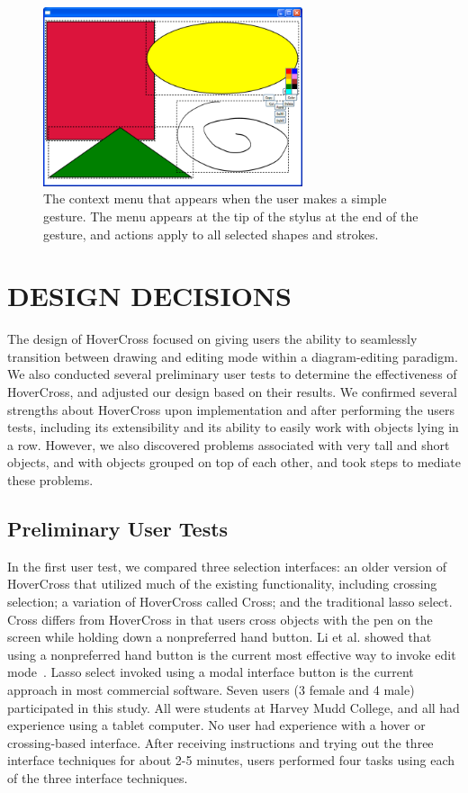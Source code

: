 \documentclass{article}
\begin{document}
\begin{figure}[tb]
\includegraphics[width=3.0in]{ColorMenu}
\caption{The context menu that appears when the user makes a simple
  gesture.  The menu appears at the tip of the stylus at the end of
  the gesture, and actions apply to all selected shapes and strokes.}
\label{fig:contextMenu}
\end{figure}

\section{DESIGN DECISIONS}
The design of HoverCross focused on giving users the ability to seamlessly transition between drawing and editing mode within a diagram-editing paradigm. We also conducted several preliminary user tests to determine the effectiveness of HoverCross, and adjusted our design based on their results.  We confirmed several strengths about HoverCross upon implementation and after performing the users tests, including its extensibility and its ability to easily work with objects lying in a row.  However, we also discovered problems associated with very tall and short objects, and with objects grouped on top of each other, and took steps to mediate these problems.

\subsection{Preliminary User Tests}

In the first user test, we compared three selection interfaces: an older version of HoverCross that utilized much of the existing functionality, including crossing selection; a variation of
HoverCross called Cross; and the traditional lasso select.  Cross
differs from HoverCross in that users cross objects with the pen on
the screen while holding down a nonpreferred hand button.  Li et
al. showed that using a nonpreferred hand button is the current most
effective way to invoke edit mode~\cite{Li2005Experimental}.  Lasso
select invoked using a modal interface button is the current approach
in most commercial software.  Seven users (3 female and 4 male) participated in this study.  All were students at Harvey Mudd College, and all had experience using
a tablet computer.  No user had experience with a hover or
crossing-based interface.  After receiving instructions and trying out the three interface
techniques for about 2-5 minutes, users performed four tasks using
each of the three interface techniques.
\end{document}

